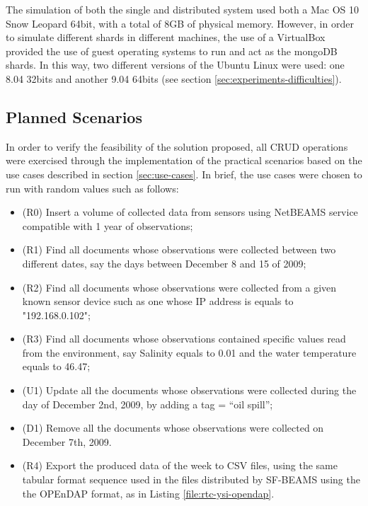 The simulation of both the single and distributed system used both a Mac OS 10
Snow Leopard 64bit, with a total of 8GB of physical memory. However, in order
to simulate different shards in different machines, the use of a VirtualBox
\cite{virtualization} provided the use of guest operating systems to run and
act as the mongoDB shards. In this way, two different versions of the Ubuntu
Linux were used: one 8.04 32bits and another 9.04 64bits (see section
\ref{sec:experiments-difficulties}).

\subsection{Planned Scenarios}
\label{sec:exp-scenarios}

In order to verify the feasibility of the solution proposed, all CRUD
operations were exercised through the implementation of the practical
scenarios based on the use cases described in section \ref{sec:use-cases}. In
brief, the use cases were chosen to run with random values such as follows:

\begin{itemize}
  \item (R0) Insert a volume of collected data from sensors using NetBEAMS
  service compatible with 1 year of observations;
  \item (R1) Find all documents whose observations were collected between two
  different dates, say the days between December 8 and 15 of 2009;
  \item (R2) Find all documents whose observations were collected from a given
  known sensor device such as one whose IP address is equals to "192.168.0.102";
  \item (R3) Find all documents whose observations contained specific values
  read from the environment, say Salinity equals to 0.01 and the water temperature
  equals to 46.47;
  \item (U1) Update all the documents whose observations were collected during
  the day of December 2nd, 2009, by adding a tag = ``oil spill'';
  \item (D1) Remove all the documents whose observations were collected on
  December 7th, 2009.
  \item (R4) Export the produced data of the week to CSV files, using the same
  tabular format sequence used in the files distributed by SF-BEAMS using the 
  the OPEnDAP format, as in Listing \ref{file:rtc-ysi-opendap}.
\end{itemize}

